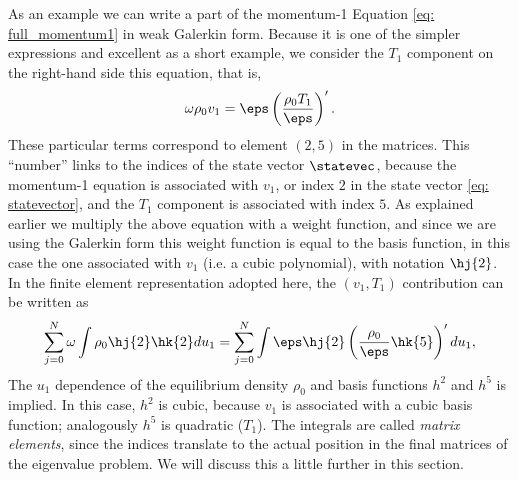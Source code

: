 As an example we can write a part of the momentum-1 Equation \eqref{eq: full_momentum1} in weak Galerkin form. Because it is one of the simpler expressions and excellent as a short example, we consider the $T_1$ component on the right-hand side this equation, that is,
\begin{equation}
  \omega \rho_0 v_1 = \eps \left(\frac{\rho_0 T_1}{\eps}\right)'.
\end{equation}
These particular terms correspond to element $(2, 5)$ in the matrices. This ``number'' links to the indices of the state vector $\statevec$, because the momentum-1 equation is associated with $v_1$, or index $2$ in the state vector \eqref{eq: statevector}, and the $T_1$ component is associated with index $5$. As explained earlier we multiply the above equation with a weight function, and since we are using the Galerkin form this weight function is equal to the basis function, in this case the one associated with $v_1$ (i.e. a cubic polynomial), with notation $\hj{2}$. In the finite element representation adopted here, the $(v_1, T_1)$ contribution can be written as
\begin{equation} \label{eq: example_rho1_T1}
  \sum_{j=0}^N\omega \int \rho_0 \hj{2}\hk{2}du_1 =
  \sum_{j=0}^N\int \eps \hj{2}\left(\frac{\rho_0}{\eps}\hk{5}\right)'du_1,
\end{equation}
The $u_1$ dependence of the equilibrium density $\rho_0$ and basis functions $h^2$ and $h^5$ is implied. In this case, $h^2$ is cubic, because $v_1$ is associated with a cubic basis function; analogously $h^5$ is quadratic ($T_1$). The integrals are called \emph{matrix elements}, since the indices translate to the actual position in the final matrices of the eigenvalue problem. We will discuss this a little further in this section.

